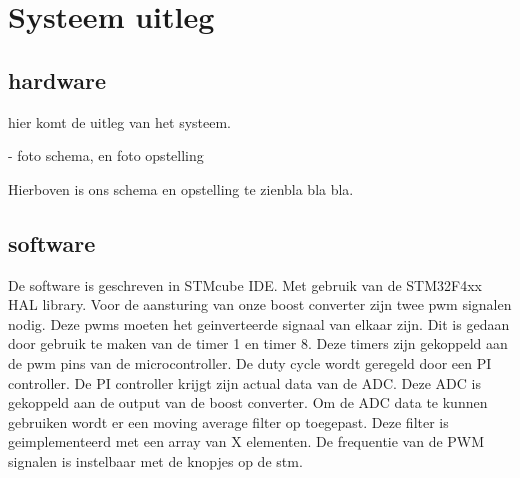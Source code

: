 \section{Systeem uitleg}


\subsection{hardware}
hier komt de uitleg van het systeem.

- foto schema, en foto opstelling

Hierboven is ons schema en opstelling te zienbla bla bla. 



\subsection{software}
De software is geschreven in STMcube IDE. Met gebruik van de STM32F4xx HAL library.
Voor de aansturing van onze boost converter zijn twee pwm signalen nodig.
Deze pwms moeten het geinverteerde signaal van elkaar zijn.
Dit is gedaan door gebruik te maken van de timer 1 en timer 8.
Deze timers zijn gekoppeld aan de pwm pins van de microcontroller.
De duty cycle wordt geregeld door een PI controller.
De PI controller krijgt zijn actual data van de ADC.
Deze ADC is gekoppeld aan de output van de boost converter.
Om de ADC data te kunnen gebruiken wordt er een moving average filter op toegepast.
Deze filter is geimplementeerd met een array van X elementen.
De frequentie van de PWM signalen is instelbaar met de knopjes op de stm.


